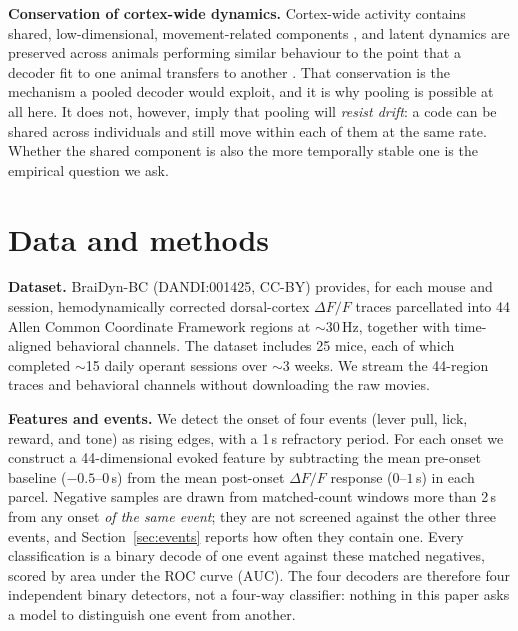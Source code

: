 \documentclass[mlabstract,onecolumn]{jmlr}
\newcommand{\auc}{\mathrm{AUC}}
\begin{document}
\textbf{Conservation of cortex-wide dynamics.} Cortex-wide activity contains shared,
low-dimensional, movement-related components \citep{musall2019,macdowell2020,macdowell2024}, and
latent dynamics are preserved across animals performing similar behaviour to the point that a decoder
fit to one animal transfers to another \citep{safaie2023}. That conservation is the mechanism a
pooled decoder would exploit, and it is why pooling is possible at all here. It does not, however,
imply that pooling will \emph{resist drift}: a code can be shared across individuals and still move
within each of them at the same rate. Whether the shared component is also the more temporally stable
one is the empirical question we ask.

\section{Data and methods}
\textbf{Dataset.} BraiDyn-BC \citep{kondo2025} (DANDI:001425, CC-BY) provides, for each mouse and
session, hemodynamically corrected dorsal-cortex $\Delta F/F$ traces parcellated into 44 Allen Common
Coordinate Framework regions at $\sim$30\,Hz, together with time-aligned behavioral channels. The
dataset includes 25 mice, each of which completed $\sim$15 daily operant sessions over $\sim$3 weeks.
We stream the 44-region traces and behavioral channels without downloading the raw movies.

\textbf{Features and events.} We detect the onset of four events (lever pull, lick, reward, and
tone) as rising edges, with a 1\,s refractory period. For each onset we construct a 44-dimensional
evoked feature by subtracting the mean pre-onset baseline ($-0.5$--$0$\,s) from the mean post-onset
$\Delta F/F$ response ($0$--$1$\,s) in each parcel. Negative samples are drawn from matched-count
windows more than 2\,s from any onset \emph{of the same event}; they are not screened against the
other three events, and Section~\ref{sec:events} reports how often they contain one. Every
classification is a binary decode of one event against these matched negatives, scored by area under
the ROC curve ($\auc$). The four decoders are therefore four independent binary detectors, not a
four-way classifier: nothing in this paper asks a model to distinguish one event from another.
\end{document}
